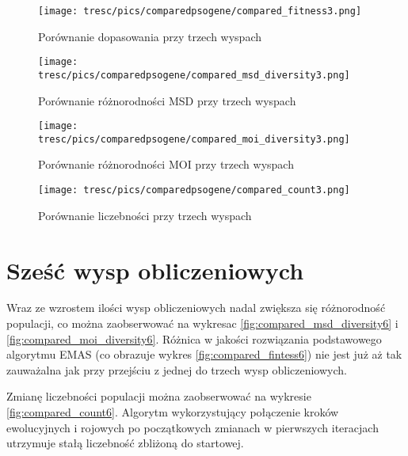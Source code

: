 \begin{figure}[H]
\begin{center} 
\texttt{[image: tresc/pics/comparedpsogene/compared\_fitness3.png]}
\caption{Porównanie dopasowania przy trzech wyspach}
\label{fig:compared_fintess3}
\end{center}
\end{figure}

\clearpage

\begin{figure}[H]
\begin{center} 
\texttt{[image: tresc/pics/comparedpsogene/compared\_msd\_diversity3.png]}
\caption{Porównanie różnorodności MSD przy trzech wyspach}
\label{fig:compared_msd_diversity3}
\end{center}
\end{figure}

\begin{figure}[H]
\begin{center} 
\texttt{[image: tresc/pics/comparedpsogene/compared\_moi\_diversity3.png]}
\caption{Porównanie różnorodności MOI przy trzech wyspach}
\label{fig:compared_moi_diversity3}
\end{center}
\end{figure}

\begin{figure}[H]
\begin{center} 
\texttt{[image: tresc/pics/comparedpsogene/compared\_count3.png]}
\caption{Porównanie liczebności przy trzech wyspach}
\label{fig:compared_count3}
\end{center}
\end{figure}


\section{Sześć wysp obliczeniowych}

Wraz ze wzrostem ilości wysp obliczeniowych nadal zwiększa się różnorodność populacji, co można zaobserwować na wykresac \ref{fig:compared_msd_diversity6} i \ref{fig:compared_moi_diversity6}. Różnica w jakości rozwiązania podstawowego algorytmu EMAS (co obrazuje wykres \ref{fig:compared_fintess6}) nie jest już aż tak zauważalna jak przy przejściu z jednej do trzech wysp obliczeniowych. 

Zmianę liczebności populacji można zaobserwować na wykresie \ref{fig:compared_count6}. Algorytm wykorzystujący połączenie kroków ewolucyjnych i rojowych po początkowych zmianach w pierwszych iteracjach utrzymuje stałą liczebność zbliżoną do startowej.

